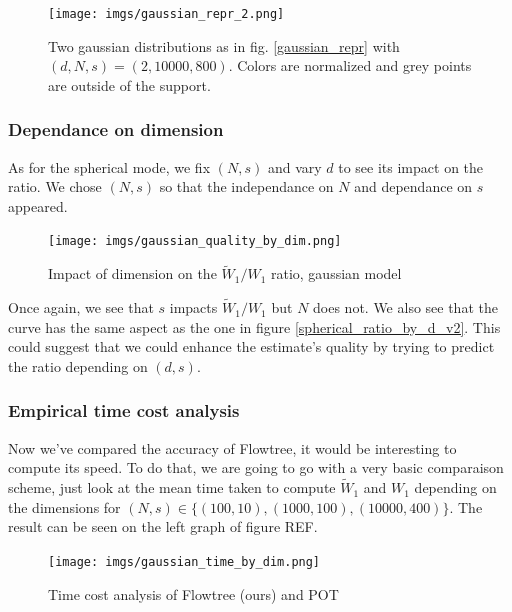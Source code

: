 \documentclass[11pt]{article}
\begin{document}
\begin{figure}[h]
\centering
\texttt{[image: imgs/gaussian\_repr\_2.png]}
\caption{Two gaussian distributions as in fig. \ref{gaussian_repr} with $(d, N, s) = (2, 10000, 800)$. Colors are normalized and grey points are outside of the support.}
\label{gaussian_repr_2}
\end{figure}

\subsubsection{Dependance on dimension}
As for the spherical mode, we fix $(N, s)$ and vary $d$ to see its impact on the ratio. We chose $(N,s)$ so that the independance on $N$ and dependance on $s$ appeared.

\begin{figure}[h]
\centering
\texttt{[image: imgs/gaussian\_quality\_by\_dim.png]}
\caption{Impact of dimension on the $\widetilde{W}_1 / W_1$ ratio, gaussian model}
\label{gaussian_quality_by_dim}
\end{figure}

Once again, we see that $s$ impacts $\widetilde{W}_1 / W_1$ but $N$ does not. We also see that the curve has the same aspect as the one in figure \ref{spherical_ratio_by_d_v2}. This could suggest that we could enhance the estimate's quality by trying to predict the ratio depending on $(d, s)$. 

\subsubsection{Empirical time cost analysis}
Now we've compared the accuracy of Flowtree, it would be interesting to compute its speed. To do that, we are going to go with a very basic comparaison scheme, just look at the mean time taken to compute $\widetilde{W}_1 $ and $W_1$ depending on the dimensions for $(N, s) \in \lbrace (100, 10), (1000, 100), (10000, 400) \rbrace$. The result can be seen on the left graph of figure REF.

\begin{figure}[h]
\centering
\texttt{[image: imgs/gaussian\_time\_by\_dim.png]}
\caption{Time cost analysis of Flowtree (ours) and POT}
\label{gaussian_time_by_dim}
\end{figure}
\end{document}
